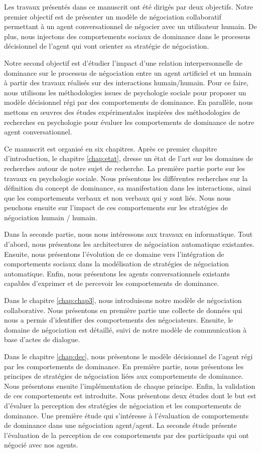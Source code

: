 Les travaux présentés dans ce manuscrit ont été dirigés
par deux objectifs. 
Notre premier objectif est de présenter un modèle de négociation collaboratif permettant à un agent conversationnel de négocier avec un utilisateur humain. De plus, nous injectons des comportements sociaux de dominance dans le processus décisionnel de l'agent qui vont orienter sa stratégie de négociation.

Notre second objectif est d'étudier l'impact d'une relation interpersonnelle de dominance sur le processus de négociation entre un agent artificiel et un humain à partir des travaux réalisés sur des interactions humain/humain.
Pour ce faire, nous utilisons les méthodologies issues de psychologie sociale pour proposer un modèle décisionnel régi par des comportements de dominance. En parallèle, nous mettons en œuvres des études expérimentales inspirées des méthodologies de recherches en psychologie pour évaluer les comportements de dominance de notre agent conversationnel.  

Ce manuscrit est organisé en six chapitres.
Après ce premier chapitre d'introduction, le chapitre \ref{chap:etat}, dresse un état de l'art sur les domaines de recherches autour de notre sujet de recherche. La première partie porte sur les travaux en psychologie sociale. Nous présentons les différentes recherches sur la définition du concept de dominance, sa manifestation dans les interactions, ainsi que les comportements verbaux et non verbaux qui y sont liés. Nous nous penchons ensuite sur l'impact de ces comportements sur les stratégies de négociation humain / humain. 

Dans la seconde partie, nous nous intéressons aux travaux en informatique. Tout d'abord, nous présentons les architectures de négociation automatique existantes. Ensuite, nous présentons l'évolution de ce domaine vers l'intégration de comportements sociaux dans la modélisation de stratégies de négociation automatique. Enfin, nous présentons les agents conversationnels existants capables d'exprimer et de percevoir les comportements de dominance. 

Dans le chapitre \ref{chap:chap3}, nous introduisons notre modèle de négociation collaborative. Nous présentons en première partie une collecte de données qui nous a permis d'identifier des comportements des négociateurs. Ensuite, le domaine de négociation est détaillé, suivi de notre modèle de communication à base d'actes de dialogue. 

Dans le chapitre \ref{chap:dec}, nous présentons le modèle décisionnel de l'agent régi par les comportements de dominance. En première partie, nous présentons les principes de stratégies de négociation liées aux comportements de dominance. Nous présentons ensuite l'implémentation de chaque principe. Enfin, la validation de ces comportements est introduite. Nous présentons deux études dont le but est d'évaluer la perception des stratégies de négociation et les comportements de dominance. Une première étude qui s'intéresse à l'évaluation de comportements de dominance dans une négociation agent/agent. La seconde étude présente l'évaluation  de la perception de ces comportements par des participants qui ont négocié avec nos agents.

